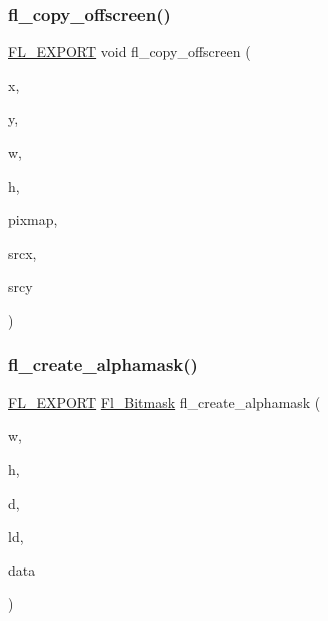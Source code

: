 \subsubsection{\texorpdfstring{fl\+\_\+copy\+\_\+offscreen()}{fl\_copy\_offscreen()}}
{\footnotesize\ttfamily \hyperlink{_fl___export_8_h_aa9ba29a18aee9d738370a06eeb4470fc}{F\+L\+\_\+\+E\+X\+P\+O\+RT} void fl\+\_\+copy\+\_\+offscreen (\begin{DoxyParamCaption}\item[{int}]{x,  }\item[{int}]{y,  }\item[{int}]{w,  }\item[{int}]{h,  }\item[{H\+B\+I\+T\+M\+AP}]{pixmap,  }\item[{int}]{srcx,  }\item[{int}]{srcy }\end{DoxyParamCaption})}

\mbox{\label{win32_8_h_ae12b3364d68f86e9e920fccc9c0b79e3}} 
\subsubsection{\texorpdfstring{fl\+\_\+create\+\_\+alphamask()}{fl\_create\_alphamask()}}
{\footnotesize\ttfamily \hyperlink{_fl___export_8_h_aa9ba29a18aee9d738370a06eeb4470fc}{F\+L\+\_\+\+E\+X\+P\+O\+RT} \hyperlink{mac_8_h_a90133b6f8cfb11ab81d83b2c4d91310d}{Fl\+\_\+\+Bitmask} fl\+\_\+create\+\_\+alphamask (\begin{DoxyParamCaption}\item[{int}]{w,  }\item[{int}]{h,  }\item[{int}]{d,  }\item[{int}]{ld,  }\item[{const \hyperlink{fl__types_8h_a65f85814a8290f9797005d3b28e7e5fc}{uchar} $\ast$}]{data }\end{DoxyParamCaption})}

\mbox{\label{win32_8_h_a5197adda8c1f9ea113311449789720e9}} 

